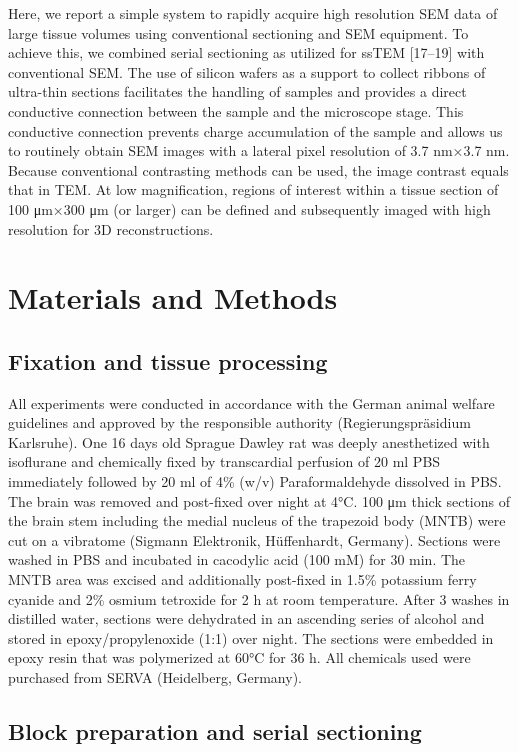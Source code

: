 \documentclass{article}
\begin{document}
Here, we report a simple system to rapidly acquire high resolution SEM data of large tissue volumes using conventional sectioning and SEM equipment. To achieve this, we combined serial sectioning as utilized for ssTEM [17–19] with conventional SEM. The use of silicon wafers as a support to collect ribbons of ultra-thin sections facilitates the handling of samples and provides a direct conductive connection between the sample and the microscope stage. This conductive connection prevents charge accumulation of the sample and allows us to routinely obtain SEM images with a lateral pixel resolution of 3.7 nm×3.7 nm. Because conventional contrasting methods can be used, the image contrast equals that in TEM. At low magnification, regions of interest within a tissue section of 100 μm×300 μm (or larger) can be defined and subsequently imaged with high resolution for 3D reconstructions.

\section*{Materials and Methods}

\subsection*{Fixation and tissue processing}

All experiments were conducted in accordance with the German animal welfare guidelines and approved by the responsible authority (Regierungspräsidium Karlsruhe). One 16 days old Sprague Dawley rat was deeply anesthetized with isoflurane and chemically fixed by transcardial perfusion of 20 ml PBS immediately followed by 20 ml of 4\% (w/v) Paraformaldehyde dissolved in PBS. The brain was removed and post-fixed over night at 4°C. 100 μm thick sections of the brain stem including the medial nucleus of the trapezoid body (MNTB) were cut on a vibratome (Sigmann Elektronik, Hüffenhardt, Germany). Sections were washed in PBS and incubated in cacodylic acid (100 mM) for 30 min. The MNTB area was excised and additionally post-fixed in 1.5\% potassium ferry cyanide and 2\% osmium tetroxide for 2 h at room temperature. After 3 washes in distilled water, sections were dehydrated in an ascending series of alcohol and stored in epoxy/propylenoxide (1:1) over night. The sections were embedded in epoxy resin that was polymerized at 60°C for 36 h. All chemicals used were purchased from SERVA (Heidelberg, Germany).

\subsection*{Block preparation and serial sectioning}
\end{document}
